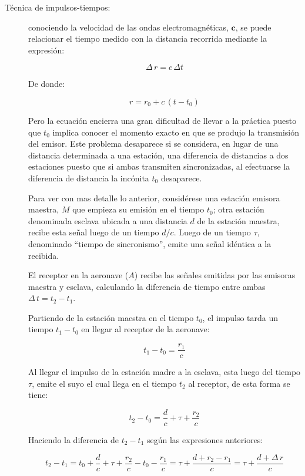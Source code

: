 \begin{description}
\item [T\'ecnica de impulsos-tiempos:] conociendo la velocidad de las ondas electromagn\'eticas, $\mathbf{c}$, se puede relacionar el tiempo medido con la distancia recorrida mediante la expresi\'on:

\[ \Delta\,r = c\,\Delta t
\]

De donde:

\[ r = r_0+c\,\left(t-t_0\right)
\]

\begin{figure}
  
\end{figure}

Pero la ecuaci\'on encierra una gran dificultad de llevar a la pr\'actica puesto que $t_0$ implica conocer el momento exacto en que se produjo la transmisi\'on del emisor. Este problema desaparece si se considera, en lugar de una distancia determinada a una estaci\'on, una diferencia de distancias a dos estaciones puesto que si ambas transmiten sincronizadas, al efectuarse la diferencia de distancia la inc\'onita $t_0$ desaparece.

Para ver con mas detalle lo anterior, consid\'erese una estaci\'on emisora maestra, $M$  que empieza su emisi\'on en el tiempo $t_0$; otra estaci\'on denominada esclava ubicada a una distancia $d$ de la estaci\'on maestra, recibe esta se\~nal luego de un tiempo $d/c$. Luego de un tiempo $\tau$, denominado ``tiempo de sincronismo'', emite una se\~nal id\'entica a la recibida. 

El receptor en la aeronave ($A$) recibe las se\~nales emitidas por las emisoras maestra y esclava, calculando la diferencia de tiempo entre ambas $\Delta\,t = t_2-t_1$. 

Partiendo de la estaci\'on maestra en el tiempo $t_0$, el impulso tarda un tiempo $t_1-t_0$ en llegar al receptor de la aeronave:

\[t_1-t_0 = \displaystyle \frac{r_1}{c}
\]

Al llegar el impulso de la estaci\'on madre a la esclava, esta luego del tiempo $\tau$, emite el suyo el cual llega en el tiempo $t_2$ al receptor, de esta forma se tiene:

\[
t_2-t_0 = \displaystyle \frac{d}{c}+\tau+\frac{r_2}{c}
\]

Haciendo la diferencia de $t_2-t_1$ seg\'un las expresiones anteriores:

\[
t_2-t_1 = t_0 + \displaystyle \frac{d}{c}+\tau+\frac{r_2}{c} - t_0 -\frac{r_1}{c} = \tau+\frac{d+r_2-r_1}{c} = \tau+\frac{d+\Delta\,r}{c}
\]


\end{description}
